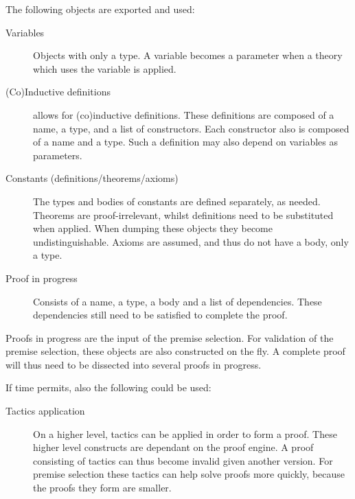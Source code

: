 The following \coq objects are exported and used:
\begin{description}
    \item[Variables]
        Objects with only a type.
        A variable becomes a parameter when a theory which uses the variable is applied.
    
    \item[(Co)Inductive definitions]
        \coq allows for (co)inductive definitions.
        These definitions are composed of a name, a type, and a list of constructors.
        Each constructor also is composed of a name and a type.
        Such a definition may also depend on variables as parameters.

    \item[Constants (definitions/theorems/axioms)]
        The types and bodies of constants are defined separately, as needed.
        Theorems are proof-irrelevant, whilst definitions need to be substituted when applied.
        When dumping these objects they become undistinguishable.
        Axioms are assumed, and thus do not have a body, only a type.
    
    \item[Proof in progress]
        Consists of a name, a type, a body and a list of dependencies.
        These dependencies still need to be satisfied to complete the proof.
\end{description}

Proofs in progress are the input of the premise selection.
For validation of the premise selection, these objects are also constructed on the fly.
A complete proof will thus need to be dissected into several proofs in progress.

If time permits, also the following could be used:
\begin{description}
    \item[Tactics application]
        On a higher level, tactics can be applied in order to form a proof.
        These higher level constructs are dependant on the proof engine.
        A proof consisting of tactics can thus become invalid given another \coq version.
        For premise selection these tactics can help solve proofs more quickly, because the proofs they form are smaller.
\end{description}
